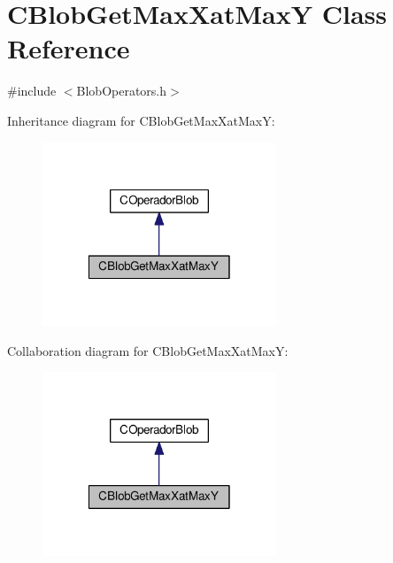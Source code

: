 \hypertarget{classCBlobGetMaxXatMaxY}{\section{C\-Blob\-Get\-Max\-Xat\-Max\-Y Class Reference}
\label{classCBlobGetMaxXatMaxY}
}


{\ttfamily \#include $<$Blob\-Operators.\-h$>$}



Inheritance diagram for C\-Blob\-Get\-Max\-Xat\-Max\-Y\-:\nopagebreak
\begin{figure}[H]
\begin{center}
\leavevmode
\includegraphics[width=198pt]{classCBlobGetMaxXatMaxY__inherit__graph}
\end{center}
\end{figure}


Collaboration diagram for C\-Blob\-Get\-Max\-Xat\-Max\-Y\-:\nopagebreak
\begin{figure}[H]
\begin{center}
\leavevmode
\includegraphics[width=198pt]{classCBlobGetMaxXatMaxY__coll__graph}
\end{center}
\end{figure}
